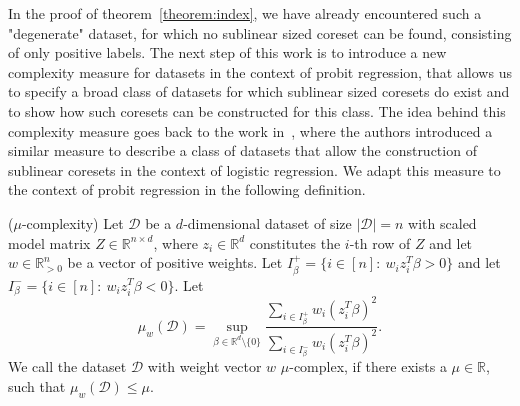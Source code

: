 In the proof of theorem~\ref{theorem:index}, we have already encountered
such a "degenerate" dataset, for which no sublinear sized coreset can be found,
consisting of only positive labels.
The next step of this work is to introduce a new complexity measure
for datasets in the context of probit regression, that allows us
to specify a broad class of datasets for which sublinear sized
coresets do exist and to show how such coresets can be constructed
for this class.
The idea behind this complexity measure goes back to
the work in~\cite{on-coresets}, where the authors introduced a similar
measure to describe a class of datasets that allow the construction
of sublinear coresets in the context of logistic regression.
We adapt this measure to the context of probit regression in the
following definition.

\begin{definition}($\mu$-complexity)
    \label{def:mu}
    Let $\mathcal{D}$ be a $d$-dimensional dataset of size
    $|\mathcal{D}|=n$ with scaled
    model matrix $Z \in \mathbb{R}^{n \times d}$, where
    $z_i \in \mathbb{R}^d$ constitutes the $i$-th
    row of $Z$ and let
    $w \in \mathbb{R}^n_{>0}$ be a vector of positive weights.
    Let $I_\beta^+ = \{i \in [n]:\ w_i z_i^T \beta > 0 \}$
    and let $I_\beta^- = \{i \in [n]:\ w_i z_i^T \beta < 0 \}$.
    Let
    \begin{equation*}
        \mu_w(\mathcal{D}) = \sup_{\beta \in \mathbb{R}^d \setminus \{0\}}
        \frac{\sum_{i \in I_\beta^+} w_i (z_i^T \beta)^2}
        {\sum_{i \in I_\beta^-} w_i (z_i^T \beta)^2}.
    \end{equation*}
    We call the dataset $\mathcal{D}$ with weight vector $w$
    $\mu$-complex, if there exists a $\mu \in \mathbb{R}$,
    such that $\mu_w(\mathcal{D}) \leq \mu$.
\end{definition}

